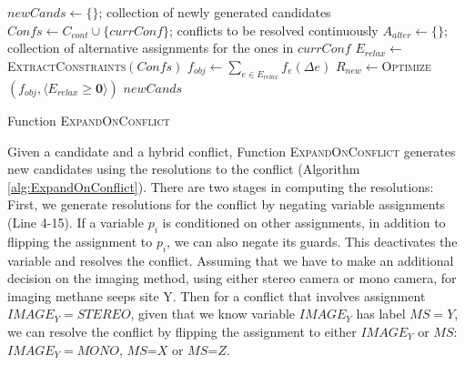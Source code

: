 \documentclass[jair,twoside,11pt,theapa]{article}
\begin{document}
\begin{algorithm}[h!]
	
	\SetAlgoLined
	\Indm
	\Initialize{}
	\Indp
	{$\mathit{newCands}\leftarrow \{\}$}; collection of newly generated candidates\;
	{$\mathit{Confs}\leftarrow C_{cont}\cup \{\mathit{currConf}\}$; conflicts to be resolved
		continuously}\;
	{$A_{alter}\leftarrow \{\}$}; collection of alternative assignments for the ones in $\mathit{currConf}$\;
	\Indm
	\Algorithm{}
	\Indp
	$E_{relax}\leftarrow$\textsc{ExtractConstraints}$(\mathit{Confs})$\;
	$f_{obj}\leftarrow\sum_{e\in E_{relax}}f_e(\Delta e)$\;
	$R_{new}\leftarrow$\textsc{Optimize}$(f_{obj},\langle
	E_{relax}\geq \textbf{0}\rangle )$\;
	\Return $\mathit{newCands}$\;
	\caption{Function \textsc{ExpandOnConflict}}
	\label{alg:ExpandOnConflict}
\end{algorithm}



Given a candidate and a hybrid conflict, Function \textsc{ExpandOnConflict} generates
new candidates using the resolutions to the conflict (Algorithm
\ref{alg:ExpandOnConflict}). There are two stages in computing the resolutions:
First, we generate resolutions for the conflict by negating variable assignments
(Line 4-15). If a variable $p_i$ is conditioned on other assignments, in
addition to flipping the assignment to $p_i$, we can also negate its guards. This
deactivates the variable and resolves the conflict. Assuming that we have to make an additional decision on the imaging method, using either stereo camera or mono camera, for imaging methane seeps site Y. Then for a conflict that involves assignment $\mathit{IMAGE_Y=STEREO}$, given that we know variable $\mathit{IMAGE_Y}$ has label $MS=Y$, we can resolve the conflict by flipping the assignment to either $\mathit{IMAGE_Y}$ or $MS$: $\mathit{IMAGE_Y=MONO}$, $MS$=$X$ or $MS$=$Z$.
\end{document}
